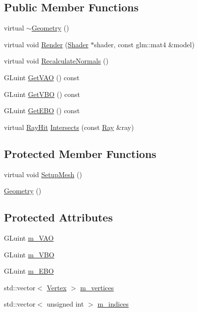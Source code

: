 \subsection*{Public Member Functions}
\begin{DoxyCompactItemize}
\item 
virtual \mbox{\hyperlink{classngl_1_1_geometry_aa8097d2400212c9c8cc0cdc810176493}{$\sim$\+Geometry}} ()
\item 
virtual void \mbox{\hyperlink{classngl_1_1_geometry_ade1f102b6bf0ae514038f3b7260bc71e}{Render}} (\mbox{\hyperlink{classngl_1_1_shader}{Shader}} $\ast$shader, const glm\+::mat4 \&model)
\item 
virtual void \mbox{\hyperlink{classngl_1_1_geometry_a1f9942dd598571558ca8361a006c1537}{Recalculate\+Normals}} ()
\item 
G\+Luint \mbox{\hyperlink{classngl_1_1_geometry_a220a013619c3722b7453da820cd447c6}{Get\+V\+AO}} () const
\item 
G\+Luint \mbox{\hyperlink{classngl_1_1_geometry_afa97818f3605182572759293ca11a0c5}{Get\+V\+BO}} () const
\item 
G\+Luint \mbox{\hyperlink{classngl_1_1_geometry_a742d8083861903ae429a24dfa1818569}{Get\+E\+BO}} () const
\item 
virtual \mbox{\hyperlink{classngl_1_1_ray_hit}{Ray\+Hit}} \mbox{\hyperlink{classngl_1_1_geometry_a494c5a8210176ae8cf02c5398e4f4bde}{Intersects}} (const \mbox{\hyperlink{classngl_1_1_ray}{Ray}} \&ray)
\end{DoxyCompactItemize}
\subsection*{Protected Member Functions}
\begin{DoxyCompactItemize}
\item 
virtual void \mbox{\hyperlink{classngl_1_1_geometry_a4da93f38cd1dd53dad93bbb7b998f1c3}{Setup\+Mesh}} ()
\item 
\mbox{\hyperlink{classngl_1_1_geometry_a1ecf63419602fb9332cd51662a101626}{Geometry}} ()
\end{DoxyCompactItemize}
\subsection*{Protected Attributes}
\begin{DoxyCompactItemize}
\item 
G\+Luint \mbox{\hyperlink{classngl_1_1_geometry_ad46e79f7d0a34a3cdfdd35d541402928}{m\+\_\+\+V\+AO}}
\item 
G\+Luint \mbox{\hyperlink{classngl_1_1_geometry_aae59ce93256ec2fb01e222ac9685172a}{m\+\_\+\+V\+BO}}
\item 
G\+Luint \mbox{\hyperlink{classngl_1_1_geometry_ad648105951e74e8ffbe594f17521ad59}{m\+\_\+\+E\+BO}}
\item 
std\+::vector$<$ \mbox{\hyperlink{structngl_1_1_vertex}{Vertex}} $>$ \mbox{\hyperlink{classngl_1_1_geometry_ac2501fd28e300ecd4aa890da9ca7cff8}{m\+\_\+vertices}}
\item 
std\+::vector$<$ unsigned int $>$ \mbox{\hyperlink{classngl_1_1_geometry_a31daa74e8595ae76eeeaee25c8ffbc91}{m\+\_\+indices}}
\end{DoxyCompactItemize}


